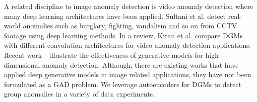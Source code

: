  

A  related discipline to image anomaly detection is video anomaly detection where many deep learning architectures have been applied. %
 Sultani  et al.  \cite{survideos1} detect real-world anomalies such as burglary, fighting, vandalism and so on from  CCTV footage using deep learning methods.  %
 In a review, Kiran et al. \cite{survideos2} compare DGMs with different  convolution architectures for  video anomaly detection applications. 
Recent work ~\cite{schlegl2017unsupervised,xu2018unsupervised,an2015variational} illustrate the effectiveness of generative models for high-dimensional anomaly detection. Although, there are existing works that have applied deep generative models in image related applications, they have not been formulated as a GAD problem. We leverage  autoencoders for DGMs %
to detect group anomalies in a variety of data experiments. 






